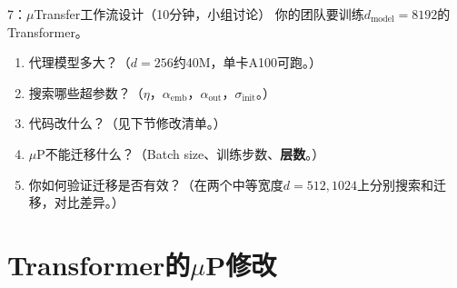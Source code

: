 \documentclass[11pt,a4paper]{article}
\begin{document}
\begin{classexercise}{7：$\mu$Transfer工作流设计（10分钟，小组讨论）}
你的团队要训练$d_{\text{model}}=8192$的Transformer。
\begin{enumerate}[label=(\alph*)]
\item 代理模型多大？（$d=256$约40M，单卡A100可跑。）
\item 搜索哪些超参数？（$\eta$，$\alpha_{\text{emb}}$，$\alpha_{\text{out}}$，$\sigma_{\text{init}}$。）
\item 代码改什么？（见下节修改清单。）
\item $\mu$P不能迁移什么？（Batch size、训练步数、\textbf{层数}。）
\item 你如何验证迁移是否有效？（在两个中等宽度$d=512,1024$上分别搜索和迁移，对比差异。）
\end{enumerate}
\end{classexercise}

\section{Transformer的$\mu$P修改}
\end{document}
